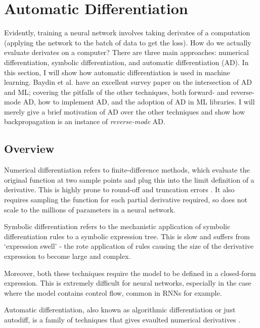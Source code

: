 \section{Automatic Differentiation}
Evidently, training a neural network involves taking derivates of a computation (applying the network to the batch of data to get the loss).
How do we actually evaluate derivates on a computer?
There are three main approaches: numerical differentiation, symbolic differentiation, and automatic differentiation (AD).
In this section, I will show how automatic differentiation is used in machine learning.
Baydin et al. \cite{Baydin2015} have an excellent survey paper on the intersection of AD and ML;
covering the pitfalls of the other techniques, both forward- and reverse-mode AD, how to implement AD, and the adoption of AD in ML libraries.
I will merely give a brief motivation of AD over the other techniques and show how backpropagation is an instance of \textit{reverse-mode} AD.

\subsection{Overview}
Numerical differentiation refers to finite-difference methods, which evaluate the original function at two sample points and plug this into the limit definition of a derivative.
This is highly prone to round-off and truncation errors \cite{Jerrell1997}.
It also requires sampling the function for each partial derivative required, so does not scale to the millions of parameters in a neural network.

Symbolic differentiation refers to the mechanistic application of symbolic differentiation rules to a symbolic expression tree.
This is slow and suffers from `expression swell' \cite{Juedes1991} - the rote application of rules causing the size of the derivative expression to become large and complex.

Moreover, both these techniques require the model to be defined in a closed-form expression.
This is extremely difficult for neural networks, especially in the case where the model contains control flow, common in RNNs for example.

Automatic differentiation, also known as algorithmic differentiation or just autodiff,
is a family of techniques that gives evaulted numerical derivatives .


